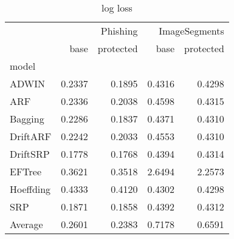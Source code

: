 \begin{table}
\caption{log loss}
\begin{tabular}{l|rr|rr|}
 & \multicolumn{2}{r}{Phishing} & \multicolumn{2}{r}{ImageSegments} \\
 & base & protected & base & protected \\
model &  &  &  &  \\
\midrule
ADWIN & 0.2337 & 0.1895 & 0.4316 & 0.4298 \\
ARF & 0.2336 & 0.2038 & 0.4598 & 0.4315 \\
Bagging & 0.2286 & 0.1837 & 0.4371 & 0.4310 \\
DriftARF & 0.2242 & 0.2033 & 0.4553 & 0.4310 \\
DriftSRP & 0.1778 & 0.1768 & 0.4394 & 0.4314 \\
EFTree & 0.3621 & 0.3518 & 2.6494 & 2.2573 \\
Hoeffding & 0.4333 & 0.4120 & 0.4302 & 0.4298 \\
SRP & 0.1871 & 0.1858 & 0.4392 & 0.4312 \\
\midrule
Average & 0.2601 & 0.2383 & 0.7178 & 0.6591 \\
\end{tabular}
\end{table}
